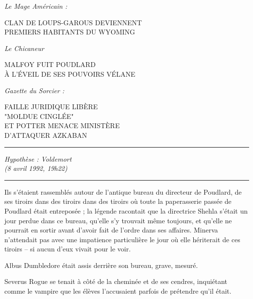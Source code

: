 \begin{center}\emph{Le Mage Américain :} \end{center}



\begin{center}CLAN DE LOUPS-GAROUS DEVIENNENT\\PREMIERS HABITANTS DU WYOMING\end{center}



\begin{center}\emph{Le Chicaneur} \end{center}



\begin{center}MALFOY FUIT POUDLARD\\À L'ÉVEIL DE SES POUVOIRS VÉLANE\end{center}



\begin{center}\emph{Gazette du Sorcier :} \end{center}



\begin{center}FAILLE JURIDIQUE LIBÈRE\\"MOLDUE CINGLÉE"\\ET POTTER MENACE MINISTÈRE\\D'ATTAQUER AZKABAN\end{center}

\par\noindent\rule{\textwidth}{0.4pt}
\emph{Hypothèse : Voldemort} \\\emph{} \emph{(8 avril 1992, 19h22)} 
\par\noindent\rule{\textwidth}{0.4pt}
Ils s'étaient rassemblés autour de l'antique bureau du directeur de Poudlard, de ses tiroirs dans des tiroirs dans des tiroirs où toute la paperasserie passée de Poudlard était entreposée ; la légende racontait que la directrice Shehla s'était un jour perdue dans ce bureau, qu'elle s'y trouvait même toujours, et qu'elle ne pourrait en sortir avant d'avoir fait de l'ordre dans ses affaires. Minerva n'attendait pas avec une impatience particulière le jour où elle hériterait de ces tiroirs – si aucun d'eux vivait pour le voir.

Albus Dumbledore était assis derrière son bureau, grave, mesuré.

Severus Rogue se tenait à côté de la cheminée et de ses cendres, inquiétant comme le vampire que les élèves l'accusaient parfois de prétendre qu'il était.

